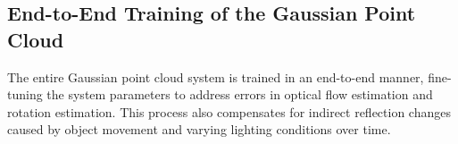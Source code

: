 \subsection{End-to-End Training of the Gaussian Point Cloud}
The entire Gaussian point cloud system is trained in an end-to-end manner, fine-tuning the system parameters to address errors in optical flow estimation and rotation estimation. This process also compensates for indirect reflection changes caused by object movement and varying lighting conditions over time.